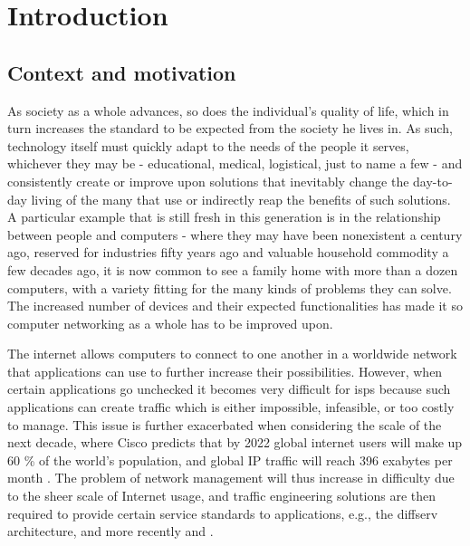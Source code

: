\chapter{Introduction}

\section{Context and motivation}

    As society as a whole advances, so does the individual's quality of life, which in turn increases the standard to be expected from the society he lives in.
    As such, technology itself must quickly adapt to the needs of the people it serves, whichever they may be - educational, medical, logistical, just to name a few - and consistently create or improve upon solutions that inevitably change the day-to-day living of the many that use or indirectly reap the benefits of such solutions.
    A particular example that is still fresh in this generation is in the relationship between people and computers - where they may have been nonexistent a century ago, reserved for industries fifty years ago and valuable household commodity a few decades ago, it is now common to see a family home with more than a dozen computers, with a variety fitting for the many kinds of problems they can solve.
    The increased number of devices and their expected functionalities has made it so computer networking as a whole has to be improved upon.

    The internet allows computers to connect to one another in a worldwide network that applications can use to further increase their possibilities.
    However, when certain applications go unchecked it becomes very difficult for \glspl{isp} because such applications can create traffic which is either impossible, infeasible, or too costly to manage.
    This issue is further exacerbated when considering the scale of the next decade, where Cisco \cite{cisco} predicts that by 2022 global internet users will make up 60 \% of the world's population, and global IP traffic will reach 396 exabytes per month \cite{cisco2019}.
    The problem of network management will thus increase in difficulty due to the sheer scale of Internet usage, and traffic engineering solutions are then required to provide certain service standards to applications, e.g., the \gls{diffserv} architecture, and more recently \cite{rev1} and \cite{rev2}.

